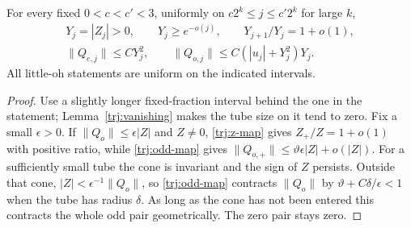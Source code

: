 \begin{lemma}\label{trj:cone}
For every fixed \(0<c<c'<3\), uniformly on
\(c2^k\le j\le c'2^k\) for large \(k\),
\begin{equation}\label{trj:cone-bounds}
 \begin{gathered}
 Y_j=|Z_j|>0,\qquad Y_j\ge e^{-o(j)},\qquad
                       Y_{j+1}/Y_j=1+o(1),\\
 \|Q_{e,j}\|\le C Y_j^2,\qquad
 \|Q_{o,j}\|\le C(|u_j|+Y_j^2)Y_j.
 \end{gathered}
\end{equation}
All little-oh statements are uniform on the indicated intervals.
\end{lemma}

\begin{proof}
Use a slightly longer fixed-fraction interval behind the one in the
statement; Lemma~\ref{trj:vanishing} makes the tube size on it tend
to zero.  Fix a small \(\epsilon>0\).  If
\(\|Q_o\|\le\epsilon|Z|\) and \(Z\ne0\),
\eqref{trj:z-map} gives \(Z_+/Z=1+o(1)\) with positive ratio, while
\eqref{trj:odd-map} gives
\(\|Q_{o,+}\|\le\vartheta\epsilon|Z|+o(|Z|)\).
For a sufficiently small tube the cone is invariant and the sign of
\(Z\) persists.  Outside that cone,
\(|Z|<\epsilon^{-1}\|Q_o\|\), so \eqref{trj:odd-map} contracts
\(\|Q_o\|\) by \(\vartheta+C\delta/\epsilon<1\) when the tube has
radius \(\delta\).  As long as the cone has not been entered this
contracts the whole odd pair geometrically.  The zero pair stays zero.


\end{proof}
